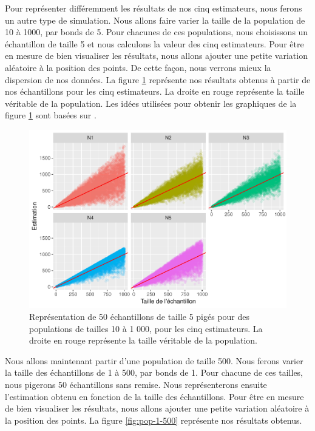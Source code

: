 \documentclass[10pt]{article}
\begin{document}
Pour représenter différemment les résultats de nos cinq estimateurs,
nous ferons un autre type de simulation. Nous allons faire varier la
taille de la population de 10 à 1000, par bonds de 5. Pour chacunes de
ces populations, nous choisissons un échantillon de taille 5 et nous
calculons la valeur des cinq estimateurs. Pour être en mesure de bien
visualiser les résultats, nous allons ajouter une petite variation
aléatoire à la position des points. De cette façon, nous verrons mieux
la dispersion de nos données. La figure \ref{fig:ech-10-1000} représente
nos résultats obtenus à partir de nos échantillons pour les cinq
estimateurs. La droite en rouge représente la taille véritable de la
population. Les idées utilisées pour obtenir les graphiques de la figure
\ref{fig:ech-10-1000} sont basées sur \cite{Hinno}.

\begin{figure}[!htb]

{\centering \includegraphics[width=0.9\linewidth]{serial_number_amq_files/figure-latex/ech-10-1000-1} 

}

\caption{Représentation de 50 échantillons de taille 5 pigés pour des populations de tailles 10 à 1 000, pour les cinq estimateurs. La droite en rouge représente la taille véritable de la population.}\label{fig:ech-10-1000}
\end{figure}

Nous allons maintenant partir d'une population de taille 500. Nous
ferons varier la taille des échantillons de 1 à 500, par bonds de 1.
Pour chacune de ces tailles, nous pigerons 50 échantillons sans remise.
Nous représenterons ensuite l'estimation obtenu en fonction de la taille
des échantillons. Pour être en mesure de bien visualiser les résultats,
nous allons ajouter une petite variation aléatoire à la position des
points. La figure \ref{fig:pop-1-500} représente nos résultats obtenus.
\end{document}
